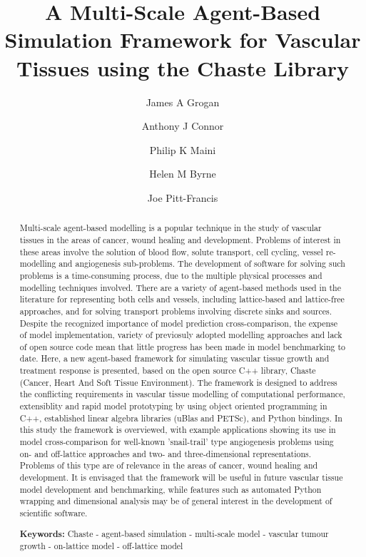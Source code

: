 \documentclass[superscriptaddress, a4paper]{article}
\begin{document}
\title{A Multi-Scale Agent-Based Simulation Framework for Vascular Tissues using the Chaste Library}

\author[1]{James A Grogan}
\author[1,2]{Anthony J Connor}
\author[1]{Philip K Maini}
\author[1]{Helen M Byrne}
\author[2]{Joe Pitt-Francis}
 
  
\date{}
  
\maketitle

\begin{abstract}
Multi-scale agent-based modelling is a popular technique in the study of vascular tissues in the areas of cancer, wound healing and development. Problems of interest in these areas involve the solution of blood flow, solute transport, cell cycling, vessel re-modelling and angiogenesis sub-problems. The development of software for solving such problems is a time-consuming process, due to the multiple physical processes and modelling techniques involved. There are a variety of agent-based methods used in the literature for representing both cells and vessels, including lattice-based and lattice-free approaches, and for solving transport problems involving discrete sinks and sources. Despite the recognized importance of model prediction cross-comparison, the expense of model implementation, variety of previosuly adopted modelling approaches and lack of open source code mean that little progress has been made in model benchmarking to date. Here, a new agent-based framework for simulating vascular tissue growth and treatment response is presented, based on the open source C++ library, Chaste (Cancer, Heart And Soft Tissue Environment). The framework is designed to address the conflicting requirements in vascular tissue modelling of computational performance, extensiblity and rapid model prototyping by using object oriented programming in C++, established linear algebra libraries (uBlas and PETSc), and Python bindings. In this study the framework is overviewed, with example applications showing its use in model cross-comparison for well-known 'snail-trail' type angiogenesis problems using on- and off-lattice approaches and two- and three-dimensional representations. Problems of this type are of relevance in the areas of cancer, wound healing and development. It is envisaged that the framework will be useful in future vascular tissue model development and benchmarking, while features such as automated Python wrapping and dimensional analysis may be of general interest in the development of scientific software.

\smallskip
\noindent \textbf{Keywords:} Chaste - agent-based simulation - multi-scale model - vascular tumour growth - on-lattice model - off-lattice model

\end{abstract}
\end{document}
